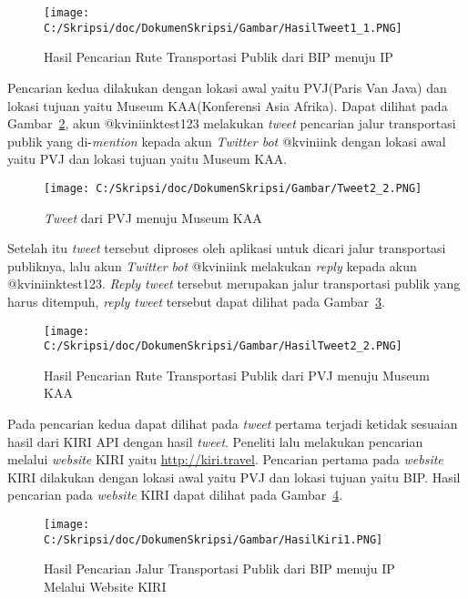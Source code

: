 \begin{enumerate}
		
	\begin{figure}
		\centering
			\texttt{[image: C:/Skripsi/doc/DokumenSkripsi/Gambar/HasilTweet1\_1.PNG]}
		\caption{Hasil Pencarian Rute Transportasi Publik dari BIP menuju IP}
		\label{fig:HasilTweet1_1}
	\end{figure}
	
	Pencarian kedua dilakukan dengan lokasi awal yaitu PVJ(Paris Van Java) dan lokasi tujuan yaitu Museum KAA(Konferensi Asia Afrika). Dapat dilihat pada Gambar~\ref{fig:Tweet2_2}, akun @kviniinktest123 melakukan \textit{tweet} pencarian jalur transportasi publik yang di-\textit{mention} kepada akun \textit{Twitter bot} @kviniink dengan lokasi awal yaitu PVJ dan lokasi tujuan yaitu Museum KAA.
	
	\begin{figure}
		\centering
			\texttt{[image: C:/Skripsi/doc/DokumenSkripsi/Gambar/Tweet2\_2.PNG]}
		\caption{\textit{Tweet} dari PVJ menuju Museum KAA}
		\label{fig:Tweet2_2}
	\end{figure}
	
	Setelah itu \textit{tweet} tersebut diproses oleh aplikasi untuk dicari jalur transportasi publiknya, lalu akun \textit{Twitter bot} @kviniink melakukan \textit{reply} kepada akun @kviniinktest123. \textit{Reply tweet} tersebut merupakan jalur transportasi publik yang harus ditempuh, \textit{reply tweet} tersebut dapat dilihat pada Gambar~\ref{fig:HasilTweet2_2}.
	
	
	\begin{figure}
		\centering
			\texttt{[image: C:/Skripsi/doc/DokumenSkripsi/Gambar/HasilTweet2\_2.PNG]}
		\caption{Hasil Pencarian Rute Transportasi Publik dari PVJ menuju Museum KAA}
		\label{fig:HasilTweet2_2}
	\end{figure}
	
	Pada pencarian kedua dapat dilihat pada \textit{tweet} pertama terjadi ketidak sesuaian hasil dari KIRI API dengan hasil \textit{tweet}.
	Peneliti lalu melakukan pencarian melalui \textit{website} KIRI yaitu \url{http://kiri.travel}. Pencarian pertama pada \textit{website} KIRI dilakukan dengan lokasi awal yaitu PVJ dan lokasi tujuan yaitu BIP. Hasil pencarian pada \textit{website} KIRI dapat dilihat pada Gambar~\ref{fig:HasilKiri1}.
	
	
	\begin{figure}
		\centering
			\texttt{[image: C:/Skripsi/doc/DokumenSkripsi/Gambar/HasilKiri1.PNG]}
		\caption{Hasil Pencarian Jalur Transportasi Publik dari BIP menuju IP Melalui Website KIRI}
		\label{fig:HasilKiri1}
	\end{figure}
	

\end{enumerate}
